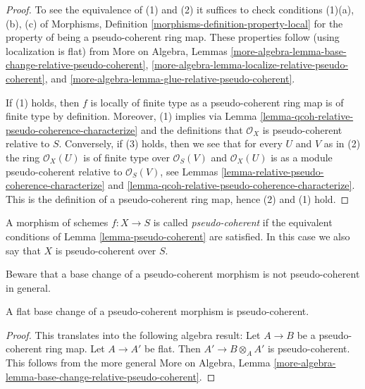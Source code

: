 \begin{proof}
To see the equivalence of (1) and (2) it suffices to check conditions
(1)(a), (b), (c) of
Morphisms, Definition \ref{morphisms-definition-property-local}
for the property of being a pseudo-coherent ring map.
These properties follow (using localization is flat) from
More on Algebra, Lemmas
\ref{more-algebra-lemma-base-change-relative-pseudo-coherent},
\ref{more-algebra-lemma-localize-relative-pseudo-coherent}, and
\ref{more-algebra-lemma-glue-relative-pseudo-coherent}.

\medskip\noindent
If (1) holds, then $f$ is locally of finite type as a pseudo-coherent
ring map is of finite type by definition. Moreover, (1) implies
via Lemma \ref{lemma-qcoh-relative-pseudo-coherence-characterize}
and the definitions that $\mathcal{O}_X$ is pseudo-coherent
relative to $S$. Conversely, if (3) holds, then we see
that for every $U$ and $V$ as in (2) the ring
$\mathcal{O}_X(U)$ is of finite type over $\mathcal{O}_S(V)$
and $\mathcal{O}_X(U)$ is as a module
pseudo-coherent relative to $\mathcal{O}_S(V)$, see
Lemmas \ref{lemma-relative-pseudo-coherence-characterize} and
\ref{lemma-qcoh-relative-pseudo-coherence-characterize}.
This is the definition of a pseudo-coherent ring map, hence
(2) and (1) hold.
\end{proof}

\begin{definition}
\label{definition-pseudo-coherent}
A morphism of schemes $f : X \to S$ is called {\it pseudo-coherent}
if the equivalent conditions of
Lemma \ref{lemma-pseudo-coherent}
are satisfied. In this case we also say that $X$ is pseudo-coherent
over $S$.
\end{definition}

\noindent
Beware that a base change of a pseudo-coherent morphism is not
pseudo-coherent in general.

\begin{lemma}
\label{lemma-flat-base-change-pseudo-coherent}
A flat base change of a pseudo-coherent morphism is pseudo-coherent.
\end{lemma}

\begin{proof}
This translates into the following algebra result:
Let $A \to B$ be a pseudo-coherent ring map.
Let $A \to A'$ be flat. Then $A' \to B \otimes_A A'$ is
pseudo-coherent. This follows from the more general
More on Algebra,
Lemma \ref{more-algebra-lemma-base-change-relative-pseudo-coherent}.
\end{proof}

